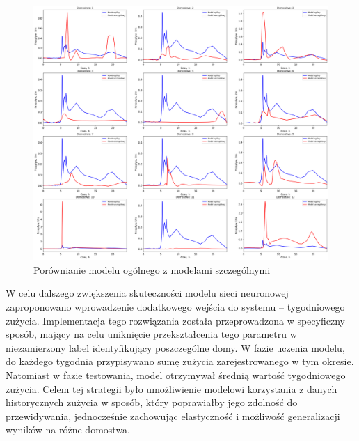 \documentclass[a4paper,twoside,12pt]{book}
\begin{document}
\begin{figure}[!h]
  \centering
  \includegraphics[width=1\textwidth]{img/szczegółowy_ogolny_porówniaie.png}
  \caption{Porównianie modelu ogólnego z modelami szczególnymi}
  \label{fig:etykieta-rysunku}
\end{figure}


W celu dalszego zwiększenia skuteczności modelu sieci neuronowej zaproponowano wprowadzenie dodatkowego wejścia do systemu – tygodniowego zużycia. Implementacja tego rozwiązania została przeprowadzona w specyficzny sposób, mający na celu uniknięcie przekształcenia tego parametru w niezamierzony label identyfikujący poszczególne domy. W fazie uczenia modelu, do każdego tygodnia przypisywano sumę zużycia zarejestrowanego w tym okresie. Natomiast w fazie testowania, model otrzymywał średnią wartość tygodniowego zużycia. Celem tej strategii było umożliwienie modelowi korzystania z danych historycznych zużycia w sposób, który poprawiałby jego zdolność do przewidywania, jednocześnie zachowując elastyczność i możliwość generalizacji wyników na różne domostwa.
\end{document}
